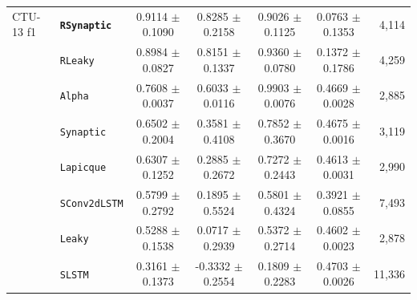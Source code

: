 \begin{table}[t]
{\begin{tabular}{l l c c c c r}
CTU-13 f1 & \textbf{\texttt{RSynaptic}} & 0.9114 $\pm$ 0.1090 & 0.8285 $\pm$ 0.2158 & 0.9026 $\pm$ 0.1125 & 0.0763 $\pm$ 0.1353 & 4{,}114 \\
 & \texttt{RLeaky} & 0.8984 $\pm$ 0.0827 & 0.8151 $\pm$ 0.1337 & 0.9360 $\pm$ 0.0780 & 0.1372 $\pm$ 0.1786 & 4{,}259 \\
 & \texttt{Alpha} & 0.7608 $\pm$ 0.0037 & 0.6033 $\pm$ 0.0116 & 0.9903 $\pm$ 0.0076 & 0.4669 $\pm$ 0.0028 & 2{,}885 \\
 & \texttt{Synaptic} & 0.6502 $\pm$ 0.2004 & 0.3581 $\pm$ 0.4108 & 0.7852 $\pm$ 0.3670 & 0.4675 $\pm$ 0.0016 & 3{,}119 \\
 & \texttt{Lapicque} & 0.6307 $\pm$ 0.1252 & 0.2885 $\pm$ 0.2672 & 0.7272 $\pm$ 0.2443 & 0.4613 $\pm$ 0.0031 & 2{,}990 \\
 & \texttt{SConv2dLSTM} & 0.5799 $\pm$ 0.2792 & 0.1895 $\pm$ 0.5524 & 0.5801 $\pm$ 0.4324 & 0.3921 $\pm$ 0.0855 & 7{,}493 \\
 & \texttt{Leaky} & 0.5288 $\pm$ 0.1538 & 0.0717 $\pm$ 0.2939 & 0.5372 $\pm$ 0.2714 & 0.4602 $\pm$ 0.0023 & 2{,}878 \\
 & \texttt{SLSTM} & 0.3161 $\pm$ 0.1373 & -0.3332 $\pm$ 0.2554 & 0.1809 $\pm$ 0.2283 & 0.4703 $\pm$ 0.0026 & 11{,}336 \\
\bottomrule
\end{tabular}}
\end{table}
